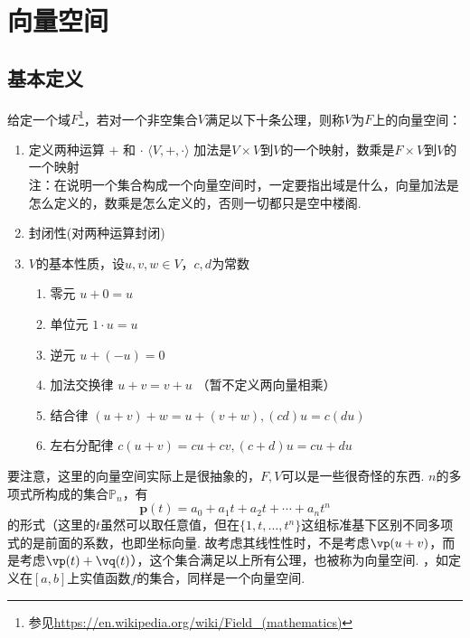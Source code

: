 
\section{向量空间}
\subsection{基本定义}
\begin{definition}
给定一个域$F$\footnote{参见\url{https://en.wikipedia.org/wiki/Field_(mathematics)}}，若对一个非空集合$V$满足以下十条公理，则称$V$为$F$上的向量空间：
\begin{enumerate}
	\item 定义两种运算 $+$ 和 $\cdot$
		$ \langle V , +, \cdot \rangle$
		加法是$V\times V$到$V$的一个映射，数乘是$F\times V$到$V$的一个映射\\
		注：在说明一个集合构成一个向量空间时，一定要指出域是什么，向量加法是怎么定义的，数乘是怎么定义的，否则一切都只是空中楼阁.
	\item 封闭性(对两种运算封闭)
	\item $V$的基本性质，设$u,v,w\in V$，$c,d$为常数
		\begin{enumerate}
			\item 零元 $u+0=u$
			\item 单位元 $1\cdot u=u$
			\item 逆元 $u+(-u)=0$
			\item 加法交换律 $u+v=v+u$ （暂不定义两向量相乘）
			\item 结合律 $(u+v)+w=u+(v+w),(cd)u=c(du)$
			\item 左右分配律 $c(u+v)=cu+cv,(c+d)u=cu+du$
		\end{enumerate}
\end{enumerate}
\end{definition}
要注意，这里的向量空间实际上是很抽象的，$F,V$可以是一些很奇怪的东西.
$n$的多项式所构成的集合$\mathbb{P}_n$，有
\[\mathbf{p}(t)=a_0+a_1t+a_2t+\cdots+a_nt^n\]
的形式（这里的$t$虽然可以取任意值，但在$\{1,t,\dots,t^n\}$这组标准基下区别不同多项式的是前面的系数，也即坐标向量. 故考虑其线性性时，不是考虑$\vp(u+v)$，而是考虑$\vp(t)+\vq(t)$），这个集合满足以上所有公理，也被称为向量空间.
，如定义在$[a,b]$上实值函数$f$的集合，同样是一个向量空间.

